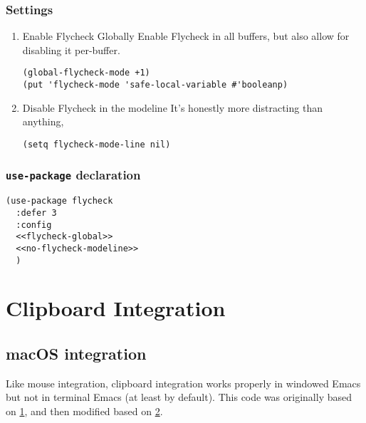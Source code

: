 \documentclass[11pt]{article}
\begin{document}
\subsubsection{Settings}
\label{sec:orgef4a8b4}
\begin{enumerate}
\item Enable Flycheck Globally
\label{sec:org71686dc}
Enable Flycheck in all buffers, but also allow for disabling it
per-buffer.

\begin{verbatim}
(global-flycheck-mode +1)
(put 'flycheck-mode 'safe-local-variable #'booleanp)
\end{verbatim}

\item Disable Flycheck in the modeline
\label{sec:org392c93d}
It's honestly more distracting than anything,

\begin{verbatim}
(setq flycheck-mode-line nil)
\end{verbatim}
\end{enumerate}

\subsubsection{\texttt{use-package} declaration}
\label{sec:org0d7b900}
\begin{verbatim}
(use-package flycheck
  :defer 3
  :config
  <<flycheck-global>>
  <<no-flycheck-modeline>>
  )
\end{verbatim}
\section{Clipboard Integration}
\label{sec:orgc80cfd1}
\subsection{macOS integration}
\label{sec:org1c450e2}
Like mouse integration, clipboard integration
works properly in windowed Emacs but not in terminal Emacs (at
least by default). This code was originally based on \href{https://gist.github.com/the-kenny/267162}{1}, and then
modified based on \href{http://emacs.stackexchange.com/q/26471/12534}{2}.
\end{document}
